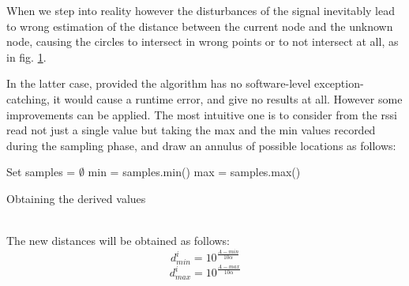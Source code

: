 \documentclass[12pt,twoside]{report}
\begin{document}
When we step into reality however the disturbances of the signal inevitably lead to wrong estimation of the distance between the current node and the unknown node, causing the circles to intersect in wrong points or to not intersect at all, as in fig. \ref{fig:trilKO}.
\begin{figure}
    \centering
    \caption{}
    \label{fig:trilKO}
\end{figure}
In the latter case, provided the algorithm has no software-level exception-catching, it would cause a runtime error, and give no results at all. However some improvements can be applied. The most intuitive one is to consider from the rssi read not just a single value but taking the max and the min values recorded during the sampling phase, and draw an annulus of possible locations as follows:
\begin{algorithm}[H]
\SetAlgoLined
{}
 Set samples = $\emptyset$\;
 min = samples.min()\;
 max = samples.max()\;
 \caption{Obtaining the derived values}
\end{algorithm}
\noindent\\The new distances will be obtained as follows:
\begin{equation}
    d^i_{min}=10^{\frac{A-min}{10\alpha}}    
\end{equation}
\begin{equation}
    d^i_{max}=10^{\frac{A-max}{10\alpha}}    
\end{equation}
\end{document}
